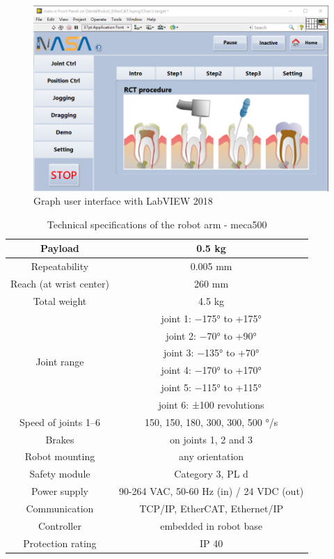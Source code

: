 \begin{figure}[htbp]
\begin{center}
\includegraphics[width=1\linewidth]{Images/GUI.png}
\caption{Graph user interface with LabVIEW 2018}
\label{fig:GUI}
\end{center}
\end{figure}
\begin{table}[htbp]
\centering
\caption{Technical specifications of the robot arm - meca500}
\label{tab:meca_specification}
\par
\begin{tabular}{|c|c|} 
\hline
Payload						&0.5 kg					\\	\hline
Repeatability				&0.005 mm					\\	\hline
Reach (at wrist center)		&260 mm	\\ \hline
Total weight				&4.5 kg						\\	\hline
\multirow{6}{*}{Joint range}&joint 1: −175° to +175°				\\	
							&joint 2: −70° to +90°				\\	
							&joint 3: −135° to +70°				\\	
							&joint 4: −170° to +170°				\\	
							&joint 5: −115° to +115°				\\	
							&joint 6: ±100 revolutions				\\	\hline
Speed of joints 1–6 &{150, 150, 180, 300, 300, 500} °/s				\\	\hline
Brakes 				&on joints 1, 2 and 3				\\	\hline
Robot mounting 		&any orientation				\\	\hline
Safety module		&Category 3, PL d				\\	\hline
Power supply 		&90-264 VAC, 50-60 Hz (in) / 24 VDC (out)				\\	\hline
Communication 		&TCP/IP, EtherCAT, Ethernet/IP				\\	\hline
Controller 			&embedded in robot base				\\	\hline
Protection rating 	&IP 40								\\	
\hline
\end{tabular}
\end{table}

